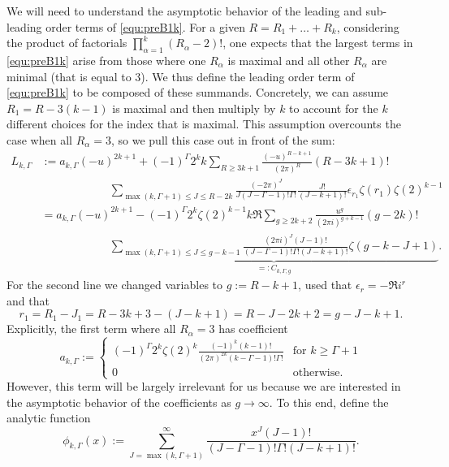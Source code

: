 \documentclass[12pt]{amsart}
\theoremstyle{definition}
\numberwithin{equation}{section}
\theoremstyle{definition} %
\theoremstyle{remark}
\begin{document}
We will need to understand the asymptotic behavior of the leading and sub-leading order terms of \eqref{equ:preB1k}. For a given $R = R_1 + \ldots + R_k$, considering the product of factorials $\prod_{\alpha=1}^k(R_\alpha - 2)!$, one expects that the largest terms in \eqref{equ:preB1k} arise from those where one $R_\alpha$ is maximal and all other $R_\alpha$ are minimal (that is equal to $3$).
We thus define the leading order term of \eqref{equ:preB1k} to be composed of these summands. Concretely, we can assume $R_1 = R - 3(k-1)$ is maximal and then multiply by $k$ to account for the $k$ different choices for the index that is maximal. This assumption overcounts the case when all $R_\alpha = 3$, so we pull this case out in front of the sum:
\begin{equation}\label{equ:LkGamma}
\begin{aligned}
    L_{k,\Gamma} &:= a_{k,\Gamma}(-u)^{2k+1}+
    (-1)^\Gamma 2^k
    k
    \sum_{R\geq 3k+1}
    \frac{(-u)^{R-k+1}}{(2\pi)^{R}}
    (R-3k+1)!
    \\ &\quad\quad\quad\quad\quad\quad
    \sum_{\max(k,\Gamma+1)\leq J\leq R-2k} 
    \frac{(-2\pi)^J}{J (J-\Gamma-1)! \Gamma!}
    \frac{J!}{(J-k+1)!} 
    \epsilon_{r_1}\zeta(r_1)
    \zeta(2)^{k-1} 
    \\&= a_{k,\Gamma}(-u)^{2k+1}
    -(-1)^\Gamma 2^k\zeta(2)^{k-1} k
    \Re 
    \sum_{g\geq 2k+2}
    \frac{u^{g}}{(2\pi i)^{g+k-1}}(g-2k)!
    \\ &\quad\quad\quad\quad\quad\quad
    \underbrace{\sum_{\max(k,\Gamma+1)\leq J\leq g-k-1} 
    \frac{(2\pi i)^J (J-1)!}{ (J-\Gamma-1)! \Gamma!(J-k+1)!}
    \zeta(g-k-J+1)}_{=:C_{k,\Gamma,g}}.
\end{aligned} 
\end{equation}
For the second line we changed variables to $g:=R-k+1$, used that $\epsilon_r=-\Re i^r$ and that $$r_1=R_1-J_1=R-3k+3-(J-k+1)=R-J-2k+2=g-J-k+1.$$
Explicitly, the first term where all $R_\alpha = 3$ has coefficient
\[
    a_{k,\Gamma} := 
    \begin{cases} 
    (-1)^\Gamma 2^k\zeta(2)^k
    \frac{(-1)^k (k-1)!}{(2\pi)^{2k} (k-\Gamma-1)!\Gamma!} 
    & \text{for $k\geq \Gamma+1$} \\
    0 &\text{otherwise.}
    \end{cases}
\]
However, this term will be largely irrelevant for us because we are interested in the asymptotic behavior of the coefficients as $g\to\infty $. To this end, define the analytic function
\[
    \phi_{k,\Gamma}(x)
    :=
    \sum_{J=\max(k,\Gamma+1)}^\infty
    \frac{x^J (J-1)!}{ (J-\Gamma-1)! \Gamma!(J-k+1)!}.
\]
\end{document}
